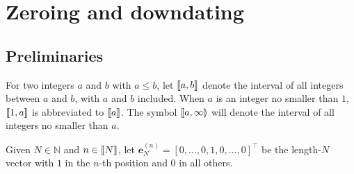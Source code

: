 \documentclass[11pt,a4paper]{article}
\DeclarePairedDelimiter\Brackets{\llbracket}{\rrbracket}
\DeclarePairedDelimiter\SemiOpenBrackets{\llbracket}{\rrparenthesis}
\theoremstyle{break}
\numberwithin{dummy}{section}
\theoremstyle{plain}
\theoremstyle{plain}
\theoremstyle{plain}
\theoremstyle{plain}
\theoremstyle{plain}
\theoremstyle{MyNonumberplain}
\newcommand{\0}{\M{0}}
\newcommand{\M}[1]{\mathbf{#1}}
\newcommand{\Mt}[1]{\tilde{\M{#1}}}
\newcommand{\N}{\mathbb{N}}
\newcommand{\T}{\top}
\newcommand{\eve}[2]{\mathbf{e}^{(#1)}_{#2}}
\begin{document}

\section{Zeroing and downdating}

\subsection{Preliminaries}

For two integers $a$ and $b$ with $a \leq b$, let $\Brackets{a,b}$ denote the interval of all integers between $a$ and $b$, with $a$ and $b$ included. When $a$ is an integer no smaller than $1$, $\Brackets{1,a}$ is abbreviated to $\Brackets{a}$. The symbol $\SemiOpenBrackets{a, \infty}$ will denote the interval of all integers no smaller than $a$.

Given $N \in \N$ and $n \in \Brackets{N}$, let $\eve{n}{N} = [0, \dots, 0, 1, 0, \dots, 0]^\T$ be the length-$N$ vector with $1$ in the $n$-th position and $0$ in all others.
\end{document}
